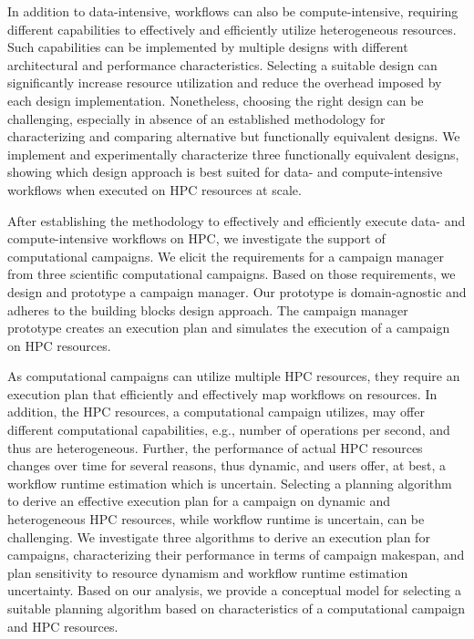 In addition to data-intensive, workflows can also be compute-intensive,
requiring different capabilities to effectively and efficiently utilize
heterogeneous resources. Such capabilities can be implemented by multiple
designs with different architectural and performance characteristics. Selecting
a suitable design can significantly increase resource utilization and reduce the
overhead imposed by each design implementation. Nonetheless, choosing the right
design can be challenging, especially in absence of an established methodology
for characterizing and comparing alternative but functionally equivalent
designs. We implement and experimentally characterize three functionally
equivalent designs, showing which design approach is best suited for data- and
compute-intensive workflows when executed on HPC resources at scale.

After establishing the methodology to effectively and efficiently execute data-
and compute-intensive workflows on HPC, we investigate the support of
computational campaigns. We elicit the requirements for a campaign manager from
three scientific computational campaigns. Based on those requirements, we design
and prototype a campaign manager. Our prototype is domain-agnostic and adheres
to the building blocks design approach. The campaign manager prototype creates
an execution plan and simulates the execution of a campaign on HPC resources.

As computational campaigns can utilize multiple HPC resources, they require an
execution plan that efficiently and effectively map workflows on resources. In
addition, the HPC resources, a computational campaign utilizes, may offer
different computational capabilities, e.g., number of operations per second,
and thus are heterogeneous. Further, the performance of actual HPC resources
changes over time for several reasons, thus dynamic, and users offer, at best,
a workflow runtime estimation which is uncertain. Selecting a planning
algorithm to derive an effective execution plan for a campaign on dynamic and
heterogeneous HPC resources, while workflow runtime is uncertain, can be
challenging. We investigate three algorithms to derive an execution plan for
campaigns, characterizing their performance in terms of campaign makespan, and
plan sensitivity to resource dynamism and workflow runtime estimation
uncertainty. Based on our analysis, we provide a conceptual model for selecting
a suitable planning algorithm based on characteristics of a computational
campaign and HPC resources.

